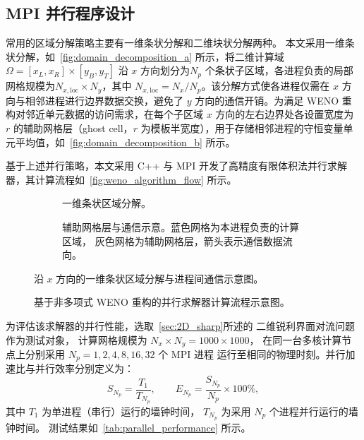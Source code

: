 \documentclass[12pt,a4paper]{article}
\numberwithin{equation}{section}    %
\begin{document}
\subsection{MPI 并行程序设计}

常用的区域分解策略主要有一维条状分解和二维块状分解两种。
本文采用一维条状分解，如~\autoref{fig:domain_decomposition_a} 所示，将二维计算域 $\Omega = [x_L, x_R] \times [y_B, y_T]$ 沿 $x$ 方向划分为$N_p$ 个条状子区域，各进程负责的局部网格规模为$N_{x,\text{loc}} \times N_y$，其中 $N_{x,\text{loc}} = N_x / N_p$。该分解方式使各进程仅需在 $x$ 方向与相邻进程进行边界数据交换，避免了 $y$ 方向的通信开销。为满足 WENO 重构对邻近单元数据的访问需求，在每个子区域 $x$ 方向的左右边界处各设置宽度为 $r$ 的辅助网格层（ghost cell，$r$ 为模板半宽度），用于存储相邻进程的守恒变量单元平均值，如~\autoref{fig:domain_decomposition_b} 所示。

基于上述并行策略，本文采用 C++ 与 MPI 开发了高精度有限体积法并行求解器，其计算流程如~\autoref{fig:weno_algorithm_flow} 所示。

\begin{figure}[!htbp]
    \centering
    \begin{subfigure}[t]{0.45\linewidth}
        \centering
        
        \caption{一维条状区域分解。}
        \label{fig:domain_decomposition_a}
    \end{subfigure}
    \hfill
    \begin{subfigure}[t]{0.45\linewidth}
        \centering
        
        \caption{辅助网格层与通信示意。蓝色网格为本进程负责的计算区域，
                 灰色网格为辅助网格层，箭头表示通信数据流向。}
        \label{fig:domain_decomposition_b}
    \end{subfigure}
    \caption{沿 $x$ 方向的一维条状区域分解与进程间通信示意图。}
    \label{fig:domain_decomposition}
\end{figure}

\begin{figure}[!htbp]
    \centering
    
    \caption{基于非多项式 WENO 重构的并行求解器计算流程示意图。}
    \label{fig:weno_algorithm_flow}
\end{figure}

为评估该求解器的并行性能，选取~\autoref{sec:2D_sharp}所述的
二维锐利界面对流问题作为测试对象，
计算网格规模为 $N_x \times N_y = 1000 \times 1000$，
在同一台多核计算节点上分别采用 $N_p = 1, 2, 4, 8, 16, 32$ 个 MPI 进程
运行至相同的物理时刻。并行加速比与并行效率分别定义为：
\begin{equation}
    S_{N_p} = \frac{T_1}{T_{N_p}}, \qquad
    E_{N_p} = \frac{S_{N_p}}{N_p} \times 100\%,
\end{equation}
其中 $T_1$ 为单进程（串行）运行的墙钟时间，
$T_{N_p}$ 为采用 $N_p$ 个进程并行运行的墙钟时间。
测试结果如~\autoref{tab:parallel_performance} 所示。
\end{document}
